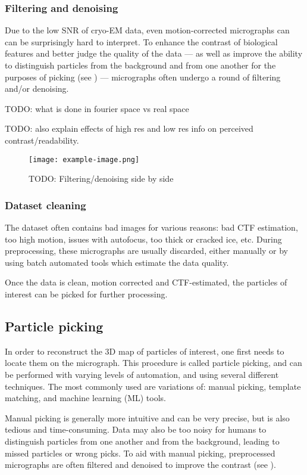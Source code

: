 \subsubsection{Filtering and denoising}\label{filtering_and_denoising}

Due to the low SNR of cryo-EM data, even motion-corrected micrographs can can be surprisingly hard to interpret.
To enhance the contrast of biological features and better judge the quality of the data --- as well as improve the ability to distinguish particles from the background and from one another for the purposes of picking (see ) --- micrographs often undergo a round of filtering and/or denoising.

TODO: what is done in fourier space vs real space

TODO: also explain effects of high res and low res info on perceived contrast/readability.

\begin{figure}[ht]
    \centering
    \texttt{[image: example-image.png]}
    \caption{TODO: Filtering/denoising side by side}
    \label{fig:filtering}
\end{figure}

\subsubsection{Dataset cleaning}
The dataset often contains bad images for various reasons: bad CTF estimation, too high motion, issues with autofocus, too thick or cracked ice, etc.
During preprocessing, these micrographs are usually discarded, either manually or by using batch automated tools which estimate the data quality.

Once the data is clean, motion corrected and CTF-estimated, the particles of interest can be picked for further processing.

\subsection{Particle picking}\label{particle_picking}
In order to reconstruct the 3D map of particles of interest, one first needs to locate them on the micrograph.
This procedure is called particle picking, and can be performed with varying levels of automation, and using several different techniques.
The most commonly used are variations of: manual picking, template matching, and machine learning (ML) tools.

Manual picking is generally more intuitive and can be very precise, but is also tedious and time-consuming.
Data may also be too noisy for humans to distinguish particles from one another and from the background, leading to missed particles or wrong picks.
To aid with manual picking, preprocessed micrographs are often filtered and denoised to improve the contrast (see ).

